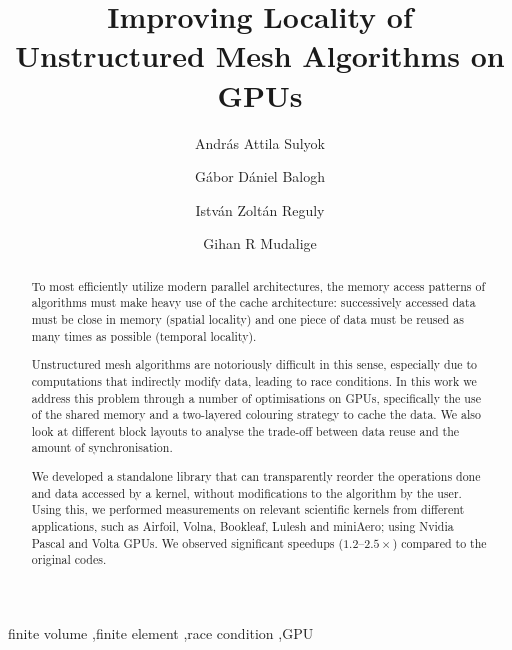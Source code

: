 \documentclass[number]{elsarticle}
\begin{document}
\begin{frontmatter}

  \title{Improving Locality of Unstructured Mesh Algorithms on GPUs}

  \author[1]{András Attila Sulyok}
  \author[1]{Gábor Dániel Balogh}
  \author[1]{István Zoltán Reguly}
  \author[2]{Gihan R Mudalige}
  \address[1]{
    Faculty of Information Technology and Bionics,
    Pázmány Péter Catholic University,
    Hungary
  }
  \address[2]{
    Department of Computer Science,
    University of Warwick,
    United Kingdom
  }

  \begin{abstract}
    To most efficiently utilize modern parallel architectures, the memory access
    patterns of algorithms must make heavy use of the cache architecture:
    successively accessed data must be close in memory (spatial locality) and
    one piece of data must be reused as many times as possible (temporal
    locality).

    Unstructured mesh algorithms are notoriously difficult in this sense,
    especially due to computations that indirectly modify data, leading to race
    conditions. In this work we address this problem through a number of
    optimisations on GPUs, specifically the use of the shared memory and a
    two-layered colouring strategy to cache the data. We also look at different
    block layouts to analyse the trade-off between data reuse and the amount of
    synchronisation.

    We developed a standalone library that can transparently reorder the
    operations done and data accessed by a kernel, without modifications to the
    algorithm by the user. Using this, we performed measurements on relevant
    scientific kernels from different applications, such as Airfoil, Volna,
    Bookleaf, Lulesh and miniAero; using Nvidia Pascal and Volta GPUs. We
    observed significant speedups ($1.2\text{--}2.5\times$) compared to the
    original codes.
  \end{abstract}

  \begin{keyword}
    finite volume \sep finite element \sep race condition \sep GPU
  \end{keyword}

\end{frontmatter}



\end{document}
